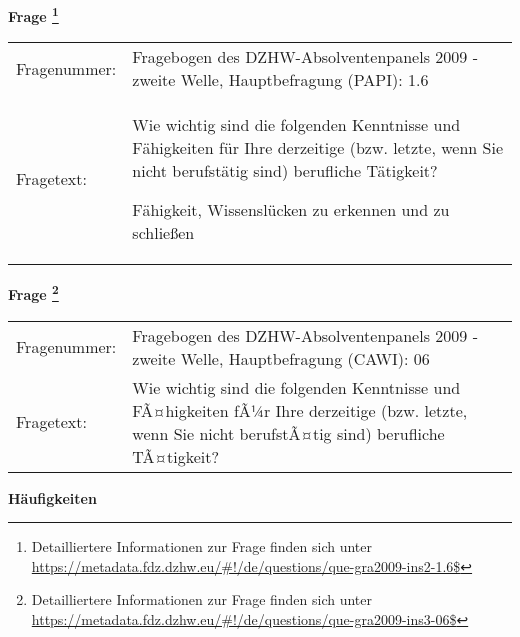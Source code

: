 				\vspace*{0.5cm}
                \noindent\textbf{Frage
	                \footnote{Detailliertere Informationen zur Frage finden sich unter
		              \url{https://metadata.fdz.dzhw.eu/\#!/de/questions/que-gra2009-ins2-1.6$}}}\\
				\begin{tabularx}{\hsize}{@{}lX}
					Fragenummer: &
					  Fragebogen des DZHW-Absolventenpanels 2009 - zweite Welle, Hauptbefragung (PAPI):
					  1.6
 \\
					Fragetext: & Wie wichtig sind die folgenden Kenntnisse und Fähigkeiten für Ihre derzeitige (bzw. letzte, wenn Sie nicht berufstätig sind) berufliche Tätigkeit?\par  Fähigkeit, Wissenslücken zu erkennen und zu schließen \\
				\end{tabularx}
				\vspace*{0.5cm}
                \noindent\textbf{Frage
	                \footnote{Detailliertere Informationen zur Frage finden sich unter
		              \url{https://metadata.fdz.dzhw.eu/\#!/de/questions/que-gra2009-ins3-06$}}}\\
				\begin{tabularx}{\hsize}{@{}lX}
					Fragenummer: &
					  Fragebogen des DZHW-Absolventenpanels 2009 - zweite Welle, Hauptbefragung (CAWI):
					  06
 \\
					Fragetext: & Wie wichtig sind die folgenden Kenntnisse und FÃ¤higkeiten fÃ¼r Ihre derzeitige (bzw. letzte, wenn Sie nicht berufstÃ¤tig sind) berufliche TÃ¤tigkeit? \\
				\end{tabularx}





        		\vspace*{0.5cm}
                \noindent\textbf{Häufigkeiten}

